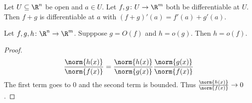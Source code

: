 \begin{exercise}[sum]
    Let $U \subseteq \R^n$ be open and $a \in U$.
    Let $f, g\colon U \to \R^m$ both be differentiable at $U$.
    Then $f+g$ is differentiable at $a$ with
    $(f+g)'(a) = f'(a) + g'(a)$.
\end{exercise}

\begin{lemma} \label{thm:oO}
    Let $f, g, h\colon \R^n \to \R^m$.
    Supppose $g = O(f)$ and $h = o(g)$.
    Then $h = o(f)$.
\end{lemma}
\begin{proof}
    \[
        \frac{\norm{h(x)}}{\norm{f(x)}}
        = \frac{\norm{h(x)}}{\norm{g(x)}} \frac{\norm{g(x)}}{\norm{f(x)}}
    \] The first term goes to $0$ and the second term is bounded.
    Thus $\frac{\norm{h(x)}}{\norm{f(x)}} \to 0$.
\end{proof}

